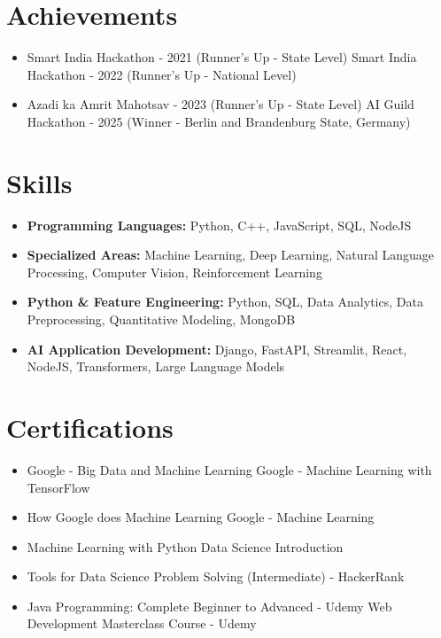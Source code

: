 \documentclass[a4paper,10pt]{article}
\begin{document}
\section*{Achievements}
\begin{itemize}
\item Smart India Hackathon - 2021 (Runner's Up - State Level) \hfill Smart India Hackathon - 2022 (Runner's Up - National Level)
\item Azadi ka Amrit Mahotsav - 2023 (Runner's Up - State Level) \hfill AI Guild Hackathon - 2025 (Winner - Berlin and Brandenburg State, Germany)
\end{itemize}

\section*{Skills}
\begin{itemize}
  \item \textbf{Programming Languages:} Python, C++, JavaScript, SQL, NodeJS
  \item \textbf{Specialized Areas:} Machine Learning, Deep Learning, Natural Language Processing, Computer Vision, Reinforcement Learning
  \item \textbf{Python \& Feature Engineering:} Python, SQL, Data Analytics, Data Preprocessing, Quantitative Modeling, MongoDB
  \item \textbf{AI Application Development:} Django, FastAPI, Streamlit, React, NodeJS, Transformers, Large Language Models
\end{itemize}

\section*{Certifications}
\begin{itemize}
\item Google - Big Data and Machine Learning \hfill Google - Machine Learning with TensorFlow
\item How Google does Machine Learning \hfill Google - Machine Learning
\item Machine Learning with Python \hfill Data Science Introduction
\item Tools for Data Science \hfill Problem Solving (Intermediate) - HackerRank
\item Java Programming: Complete Beginner to Advanced - Udemy \hfill Web Development Masterclass Course - Udemy
\end{itemize}
\end{document}
